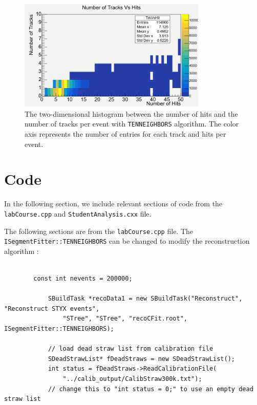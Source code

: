 \documentclass[a4paper]{report}
\numberwithin{equation}{section}
\begin{document}
\begin{figure}[htb!]
	\centering
	\includegraphics[width=0.8\textwidth]{tentracksvshits.png}
	\caption{The two-dimensional histogram between the number of hits and the number of tracks per event with \texttt{TENNEIGHBORS} algorithm. The color axis represents the number of entries for each track and hits per event. }
	\label{fig:tentracksvshits}
\end{figure} \par

\chapter{Code} \label{chap:appendix_code}

In the following section, we include relevant sections of code from the \texttt{labCourse.cpp} and \texttt{StudentAnalysis.cxx} file. 

\noindent The following sections are from the \texttt{labCourse.cpp} file. The \texttt{ISegmentFitter::TENNEIGHBORS} can be changed
to modify the reconstruction algorithm :
\begin{tcolorbox}
	\begin{verbatim}

		const int nevents = 200000;
		
			SBuildTask *recoData1 = new SBuildTask("Reconstruct", "Reconstruct STYX events",
				"STree", "STree", "recoCFit.root", ISegmentFitter::TENNEIGHBORS);
		
			// load dead straw list from calibration file
			SDeadStrawList* fDeadStraws = new SDeadStrawList();
			int status = fDeadStraws->ReadCalibrationFile(
				"../calib_output/CalibStraw300k.txt"); 
			// change this to "int status = 0;" to use an empty dead straw list
		
	\end{verbatim}
\end{tcolorbox}
\end{document}
